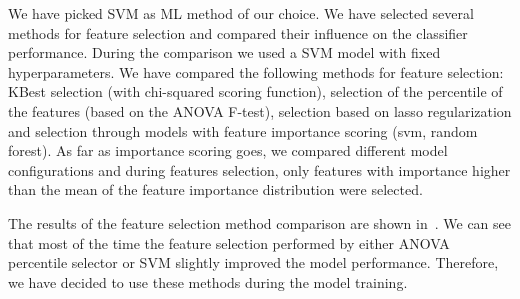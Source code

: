 We have picked SVM as ML method of our choice. We have selected several methods for feature
selection and compared their influence on the classifier performance. During the comparison
we used a SVM model with fixed hyperparameters. We have compared the following methods for
feature selection: KBest selection (with chi-squared scoring function), selection of the percentile
of the features (based on the ANOVA F-test),
selection based on lasso regularization and selection through models with feature importance
scoring (svm, random forest). As far as importance scoring goes, we compared different
model configurations and during features selection, only features with importance higher
than the mean of the feature importance distribution were selected.

The results of the feature selection method comparison are shown in~. We can see
that most of the time the feature selection performed by either ANOVA percentile selector or
SVM slightly improved the model performance. Therefore, we have decided to use these methods during
the model training.

